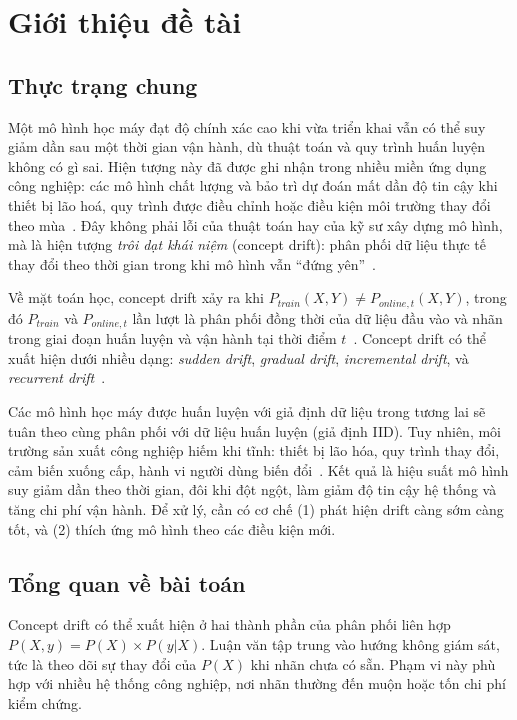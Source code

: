 \chapter{Giới thiệu đề tài}

\section{Thực trạng chung}
Một mô hình học máy đạt độ chính xác cao khi vừa triển khai vẫn có thể suy
giảm dần sau một thời gian vận hành, dù thuật toán và quy trình huấn luyện
không có gì sai. Hiện tượng này đã được ghi nhận trong nhiều miền ứng dụng
công nghiệp: các mô hình chất lượng và bảo trì dự đoán mất dần độ tin cậy khi
thiết bị lão hoá, quy trình được điều chỉnh hoặc điều kiện môi trường thay đổi
theo mùa~\cite{wuest2016machine, jourdan2021machine, tripathi2021ensuring}.
Đây không phải lỗi của thuật toán hay của kỹ sư xây dựng mô hình, mà là hiện
tượng \textit{trôi dạt khái niệm} (concept drift): phân phối dữ liệu thực tế
thay đổi theo thời gian trong khi mô hình vẫn ``đứng yên''~\cite{jourdan2023process}.

Về mặt toán học, concept drift xảy ra khi $P_{train}(X, Y) \neq P_{online,t}(X, Y)$,
trong đó $P_{train}$ và $P_{online,t}$ lần lượt là phân phối đồng thời của dữ liệu
đầu vào và nhãn trong giai đoạn huấn luyện và vận hành tại thời điểm $t$~\cite{jourdan2023process}.
Concept drift có thể xuất hiện dưới nhiều dạng: \textit{sudden drift},
\textit{gradual drift}, \textit{incremental drift}, và \textit{recurrent drift}~\cite{yuan2022advances}.

Các mô hình học máy được huấn luyện với giả định dữ liệu trong tương lai
sẽ tuân theo cùng phân phối với dữ liệu huấn luyện (giả định IID). Tuy nhiên,
môi trường sản xuất công nghiệp hiếm khi tĩnh: thiết bị lão hóa, quy trình thay đổi,
cảm biến xuống cấp, hành vi người dùng biến đổi~\cite{jourdan2023process}. Kết quả là
hiệu suất mô hình suy giảm dần theo thời gian, đôi khi đột ngột, làm giảm
độ tin cậy hệ thống và tăng chi phí vận hành. Để xử lý, cần có cơ chế
(1) phát hiện drift càng sớm càng tốt, và (2) thích ứng mô hình theo các điều kiện mới.

\section{Tổng quan về bài toán}
Concept drift có thể xuất hiện ở hai thành phần của phân phối liên hợp $P(X, y) = P(X) \times P(y|X)$. Luận văn tập trung vào hướng không giám sát, tức là theo dõi sự thay đổi của $P(X)$ khi nhãn chưa có sẵn. Phạm vi này phù hợp với nhiều hệ thống công nghiệp, nơi nhãn thường đến muộn hoặc tốn chi phí kiểm chứng.

